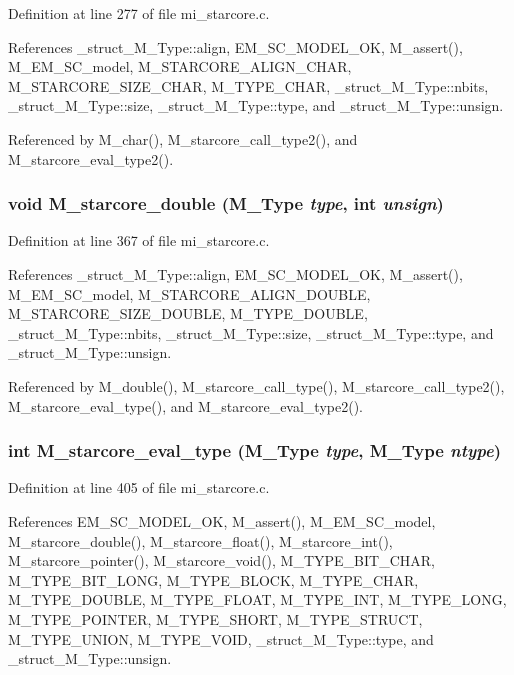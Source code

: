Definition at line 277 of file mi\_\-starcore.c.

References \_\-struct\_\-M\_\-Type::align, EM\_\-SC\_\-MODEL\_\-OK, M\_\-assert(), M\_\-EM\_\-SC\_\-model, M\_\-STARCORE\_\-ALIGN\_\-CHAR, M\_\-STARCORE\_\-SIZE\_\-CHAR, M\_\-TYPE\_\-CHAR, \_\-struct\_\-M\_\-Type::nbits, \_\-struct\_\-M\_\-Type::size, \_\-struct\_\-M\_\-Type::type, and \_\-struct\_\-M\_\-Type::unsign.

Referenced by M\_\-char(), M\_\-starcore\_\-call\_\-type2(), and M\_\-starcore\_\-eval\_\-type2().
\subsubsection{\setlength{\rightskip}{0pt plus 5cm}void M\_\-starcore\_\-double (\bf{M\_\-Type} {\em type}, int {\em unsign})}\label{mi__starcore_8c_1a4fed3007066bd3e9b1ff8dd2ff37fe}




Definition at line 367 of file mi\_\-starcore.c.

References \_\-struct\_\-M\_\-Type::align, EM\_\-SC\_\-MODEL\_\-OK, M\_\-assert(), M\_\-EM\_\-SC\_\-model, M\_\-STARCORE\_\-ALIGN\_\-DOUBLE, M\_\-STARCORE\_\-SIZE\_\-DOUBLE, M\_\-TYPE\_\-DOUBLE, \_\-struct\_\-M\_\-Type::nbits, \_\-struct\_\-M\_\-Type::size, \_\-struct\_\-M\_\-Type::type, and \_\-struct\_\-M\_\-Type::unsign.

Referenced by M\_\-double(), M\_\-starcore\_\-call\_\-type(), M\_\-starcore\_\-call\_\-type2(), M\_\-starcore\_\-eval\_\-type(), and M\_\-starcore\_\-eval\_\-type2().
\subsubsection{\setlength{\rightskip}{0pt plus 5cm}int M\_\-starcore\_\-eval\_\-type (\bf{M\_\-Type} {\em type}, \bf{M\_\-Type} {\em ntype})}\label{mi__starcore_8c_50e4c30b63b5b719d6170a200fb8e5fc}




Definition at line 405 of file mi\_\-starcore.c.

References EM\_\-SC\_\-MODEL\_\-OK, M\_\-assert(), M\_\-EM\_\-SC\_\-model, M\_\-starcore\_\-double(), M\_\-starcore\_\-float(), M\_\-starcore\_\-int(), M\_\-starcore\_\-pointer(), M\_\-starcore\_\-void(), M\_\-TYPE\_\-BIT\_\-CHAR, M\_\-TYPE\_\-BIT\_\-LONG, M\_\-TYPE\_\-BLOCK, M\_\-TYPE\_\-CHAR, M\_\-TYPE\_\-DOUBLE, M\_\-TYPE\_\-FLOAT, M\_\-TYPE\_\-INT, M\_\-TYPE\_\-LONG, M\_\-TYPE\_\-POINTER, M\_\-TYPE\_\-SHORT, M\_\-TYPE\_\-STRUCT, M\_\-TYPE\_\-UNION, M\_\-TYPE\_\-VOID, \_\-struct\_\-M\_\-Type::type, and \_\-struct\_\-M\_\-Type::unsign.

